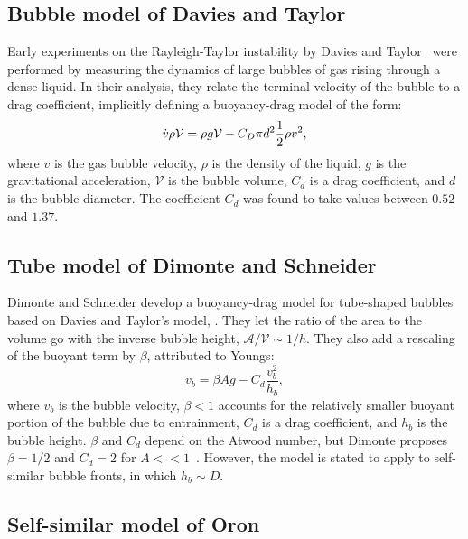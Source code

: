 \subsection{Bubble model of Davies and Taylor}

Early experiments on the Rayleigh-Taylor instability by Davies and Taylor~\cite{Davies1950a} were performed by measuring the dynamics of large bubbles of gas rising through a dense liquid.
In their analysis, they relate the terminal velocity of the bubble to a drag coefficient, implicitly defining a buoyancy-drag model of the form:
\begin{equation} \elabel{dtbd}
\dot{v} \rho \mathcal{V} = \rho g \mathcal{V} - C_D \pi d^2 \frac{1}{2} \rho v^2,
\end{equation}
where $v$ is the gas bubble velocity,
$\rho$ is the density of the liquid,
$g$ is the gravitational acceleration,
$\mathcal{V}$ is the bubble volume,
$C_d$ is a drag coefficient, and
$d$ is the bubble diameter.
The coefficient $C_d$ was found to take values between $0.52$ and $1.37$.

\subsection{Tube model of Dimonte and Schneider}

Dimonte and Schneider develop a buoyancy-drag model for tube-shaped bubbles~\cite{Dimonte1996,Dimonte2000a} based on Davies and Taylor's model, .
They let the ratio of the area to the volume go with the inverse bubble height, $\mathcal{A} / \mathcal{V} \sim 1/h$.
They also add a rescaling of the buoyant term by $\beta$, attributed to Youngs:
\begin{equation}
\dot{v_b}  = \beta A g - C_d \frac{v_b^2}{h_b}, 
\end{equation}
where $v_b$ is the bubble velocity,
$\beta < 1$ accounts for the relatively smaller buoyant portion of the bubble due to entrainment,
$C_d$ is a drag coefficient, and
$h_b$ is the bubble height.
$\beta$ and $C_d$ depend on the Atwood number, but Dimonte proposes $\beta = 1/2$ and $C_d = 2$ for $A << 1$~\cite{Dimonte2000}.
However, the model is stated to apply to self-similar bubble fronts, in which $h_b \sim D$.

\subsection{Self-similar model of Oron}

